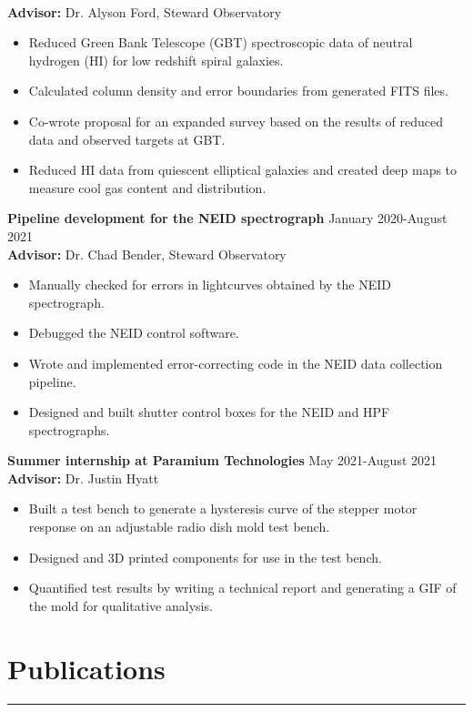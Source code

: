 \documentclass[11pt]{article}
\newcommand{\resumesection}[1]{\vspace{-0.2cm}\section*{#1}\vspace{-0.2cm}\hrule\vspace{0.2cm}}
\begin{document}
\\\textbf{Advisor:} Dr. Alyson Ford, Steward Observatory
\begin{itemize}
	\item Reduced Green Bank Telescope (GBT) spectroscopic data of neutral hydrogen (HI) for low redshift spiral galaxies. 
	\item Calculated column density and error boundaries from generated FITS files.
	\item Co-wrote proposal for an expanded survey based on the results of reduced data and observed targets at GBT.  
	\item Reduced HI data from quiescent elliptical galaxies and created deep maps to measure cool gas content and distribution. 
\end{itemize}
\textbf{Pipeline development for the NEID spectrograph} \hfill January 2020-August 2021
\\\textbf{Advisor:} Dr. Chad Bender, Steward Observatory
\begin{itemize}
	\item Manually checked for errors in lightcurves obtained by the NEID spectrograph.
	\item Debugged the NEID control software. 
	\item Wrote and implemented error-correcting code in the NEID data collection pipeline.
	\item Designed and built shutter control boxes for the NEID and HPF spectrographs.
\end{itemize}
\textbf{Summer internship at Paramium Technologies}  \hfill May 2021-August 2021
\\\textbf{Advisor:} Dr. Justin Hyatt
\begin{itemize}
	\item Built a test bench to generate a hysteresis curve of the stepper motor response on an adjustable radio dish mold test bench.
	\item Designed and 3D printed components for use in the test bench.
	\item Quantified test results by writing a technical report and generating a GIF of the mold for qualitative analysis.
\end{itemize}

\resumesection{Publications}
\end{document}
